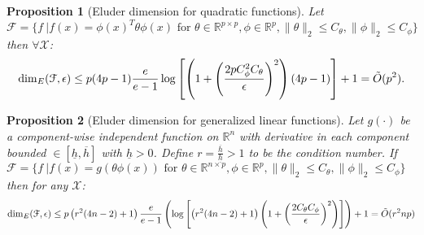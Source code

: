 \documentclass{article}
\newtheorem{prop}{Proposition}
\newcommand{\Real}{\mathds{R}}
\newcommand{\Xc}{\mathcal{X}}
\newcommand{\Fc}{\mathcal{F}}
\begin{document}
\begin{prop}[Eluder dimension for quadratic functions]
\hspace{0.00000000000001mm} \newline
Let $\mathcal{F} = \{ f \ | f(x) = \phi(x)^T \theta \phi(x)  \text{ for } \theta \in \Real^{p \times p}, \phi \in \Real^p ,
\|\theta \|_2 \le C_\theta , \|\phi\|_2 \le C_\phi \}$
then $\forall \Xc$:
$$ {\rm dim}_E(\Fc, \epsilon) \le p(4p-1)\frac{e}{e-1} \log\left[ \left(1+\left( \frac{2 p C_\phi^2 C_\theta}{\epsilon}\right)^2 \right)\left(4p-1\right) \right] + 1 = \tilde{O}(p^2). $$
\end{prop}

\begin{prop}[Eluder dimension for generalized linear functions]
\hspace{0.00000000000001mm} \newline
Let $g(\cdot)$ be a component-wise independent function on $\Real^n$ with derivative in each component bounded  $\in [\underline{h},\overline{h}]$ with $\underline{h}>0$.
Define $r = \frac{\overline{h}}{\underline{h}} > 1$ to be the condition number.
If $\mathcal{F} = \{ f \ | f(x) = g(\theta \phi(x))  \text{ for } \theta \in \Real^{n \times p}, \phi \in \Real^p ,
\|\theta \|_2 \le C_\theta , \|\phi\|_2 \le C_\phi \}$
then for any $\Xc$:
{\small
$${\rm dim}_E(\Fc, \epsilon) \le p \left(r^2(4n-2)+1\right)\frac{e}{e-1} \left(\log \left[\left(r^2(4n-2)+1 \right) \left(1+ \left(\frac{2C_\theta C_\phi}{\epsilon} \right)^2\right) \right] \right) + 1 = \tilde{O}(r^2 np)$$
}
\end{prop}

\end{document}
